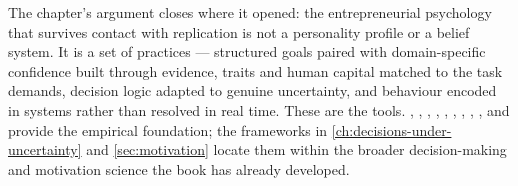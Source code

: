 The chapter's argument closes where it opened: the entrepreneurial psychology that survives
contact with replication is not a personality profile or a belief system. It is a set of
practices --- structured goals paired with domain-specific confidence built through evidence,
traits and human capital matched to the task demands, decision logic adapted to genuine
uncertainty, and behaviour encoded in systems rather than resolved in real time. These are the
tools. \textcite{bandura1997self}, \textcite{stajkovic1998self}, \textcite{locke2002building},
\textcite{rauch2007person}, \textcite{unger2011human}, \textcite{ericsson1993role},
\textcite{sarasvathy2001causation}, \textcite{lally2010habit}, \textcite{gollwitzer2006implementation},
and \textcite{thaler2004save} provide the empirical foundation; the frameworks in
\cref{ch:decisions-under-uncertainty} and \cref{sec:motivation} locate them within the broader
decision-making and motivation science the book has already developed.

